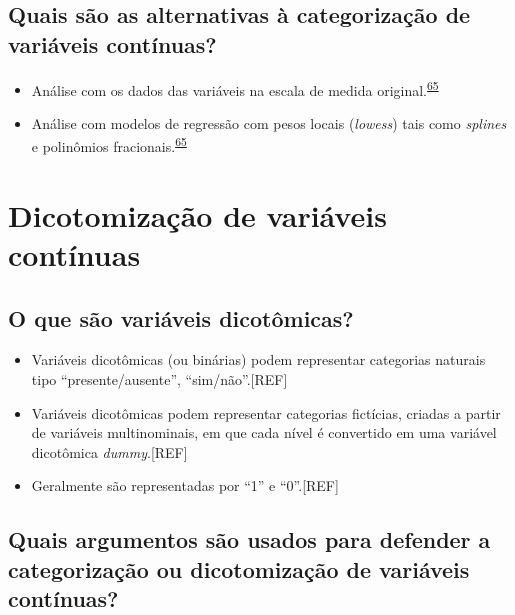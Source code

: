 \documentclass[
  a4paper,
]{book}
\begin{document}
\hypertarget{quais-suxe3o-as-alternativas-uxe0-categorizauxe7uxe3o-de-variuxe1veis-contuxednuas}{%
\subsection{Quais são as alternativas à categorização de variáveis contínuas?}\label{quais-suxe3o-as-alternativas-uxe0-categorizauxe7uxe3o-de-variuxe1veis-contuxednuas}}

\begin{itemize}
\item
  Análise com os dados das variáveis na escala de medida original.\textsuperscript{\protect\hyperlink{ref-MacCallum2002}{65}}
\item
  Análise com modelos de regressão com pesos locais (\emph{lowess}) tais como \emph{splines} e polinômios fracionais.\textsuperscript{\protect\hyperlink{ref-MacCallum2002}{65}}
\end{itemize}

\hypertarget{dicotomizacao}{%
\section{Dicotomização de variáveis contínuas}\label{dicotomizacao}}

\hypertarget{o-que-suxe3o-variuxe1veis-dicotuxf4micas}{%
\subsection{O que são variáveis dicotômicas?}\label{o-que-suxe3o-variuxe1veis-dicotuxf4micas}}

\begin{itemize}
\item
  Variáveis dicotômicas (ou binárias) podem representar categorias naturais tipo ``presente/ausente'', ``sim/não''.{[}REF{]}
\item
  Variáveis dicotômicas podem representar categorias fictícias, criadas a partir de variáveis multinominais, em que cada nível é convertido em uma variável dicotômica \emph{dummy}.{[}REF{]}
\item
  Geralmente são representadas por ``1'' e ``0''.{[}REF{]}
\end{itemize}

\hypertarget{quais-argumentos-suxe3o-usados-para-defender-a-categorizauxe7uxe3o-ou-dicotomizauxe7uxe3o-de-variuxe1veis-contuxednuas}{%
\subsection{Quais argumentos são usados para defender a categorização ou dicotomização de variáveis contínuas?}\label{quais-argumentos-suxe3o-usados-para-defender-a-categorizauxe7uxe3o-ou-dicotomizauxe7uxe3o-de-variuxe1veis-contuxednuas}}
\end{document}
